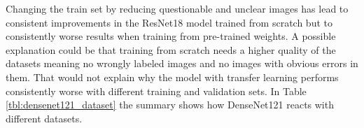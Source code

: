 \begin{table}[!h] \centering
{}
\caption{Dataset variations with ResNet18. The first column shows how the datasets performed when trained from scratch whereas the second column shows how the datasets performed with pre-training.}
\label{tbl:resnet18_dataset}
\end{table}

\quad

Changing the train set by reducing questionable and unclear images has lead to consistent improvements in the ResNet18 model trained from scratch but to consistently worse results when training from pre-trained weights. A possible explanation could be that training from scratch needs a higher quality of the datasets meaning no wrongly labeled images and no images with obvious errors in them. That would not explain why the model with transfer learning performs consistently worse with different training and validation sets. In Table \ref{tbl:densenet121_dataset} the summary shows how DenseNet121 reacts with different datasets. \\


